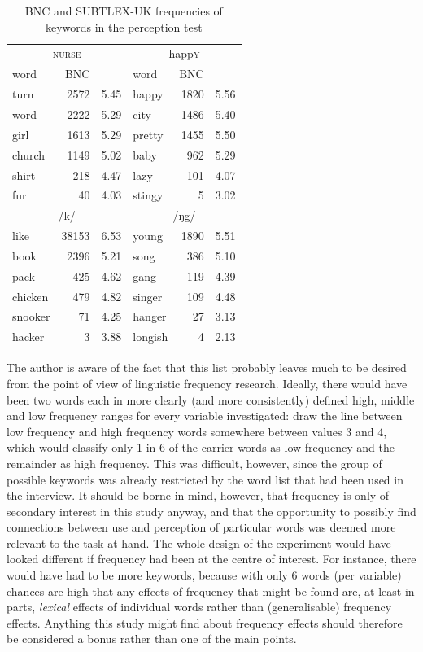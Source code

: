 \begin{table}[h]
	\caption{BNC and SUBTLEX-UK frequencies of keywords in the perception test}
	\label{tab.keywords.frequency}
	\centering
	\begin{tabular}{lrrlrr}
		\hline
		\multicolumn{3}{c}{\textsc{nurse}} & \multicolumn{3}{c}{happ\textsc{y}}\\
		word & BNC & \isi{Zipf} & word & BNC & \isi{Zipf} \\
		\hline
		turn & 2572 & 5.45 & happy & 1820 & 5.56 \\
		word & 2222 & 5.29 & city & 1486 & 5.40 \\
		girl & 1613 & 5.29 & pretty & 1455 & 5.50 \\			
		church & 1149 & 5.02 & baby & 962 & 5.29 \\
		shirt & 218 & 4.47 & lazy & 101 & 4.07 \\
		fur & 40 & 4.03 & stingy & 5 & 3.02 \\
		\hline
		\multicolumn{3}{c}{/k/} & \multicolumn{3}{c}{/ŋg/}\\
		\hline
		like & 38153 & 6.53 & young & 1890 & 5.51\\
		book & 2396 & 5.21 & song & 386 & 5.10\\
		pack & 425 & 4.62 & gang & 119 & 4.39\\
		chicken & 479 & 4.82 & singer & 109 & 4.48\\
		snooker & 71 & 4.25 & hanger & 27 & 3.13\\
		hacker & 3 & 3.88 & longish & 4 & 2.13\\
		\hline
	\end{tabular}
\end{table}

The author is aware of the fact that this list probably leaves much to be desired from the point of view of linguistic frequency research.
Ideally, there would have been two words each in more clearly (and more consistently) defined high, middle and low frequency ranges for every variable investigated: \textcite{heuvenetal2014} draw the line between low frequency and high frequency words somewhere between  values 3 and 4, which would classify only 1 in 6 of the carrier words as low frequency and the remainder as high frequency.
This was difficult, however, since the group of possible keywords was already restricted by the word list that had been used in the interview.
It should be borne in mind, however, that frequency is only of secondary interest in this study anyway, and that the opportunity to possibly find connections between use and perception of particular words was deemed more relevant to the task at hand.
The whole design of the experiment would have looked different if frequency had been at the centre of interest.
For instance, there would have had to be more keywords, because with only 6 words (per variable) chances are high that any effects of frequency that might be found are, at least in parts, \emph{lexical} effects of individual words rather than (generalisable) frequency effects.
Anything this study might find about frequency effects should therefore be considered a bonus rather than one of the main points.

